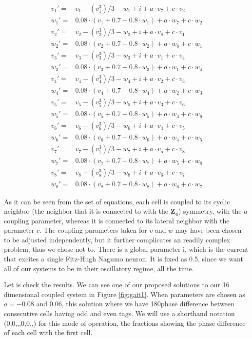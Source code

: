 \begin{align}
\nonumber v_1'=& v_1-(v_1^3)/3-w_1+i+a\cdot v_7+c \cdot v_2 \\
\nonumber w_1'=& 0.08\cdot (v_1+0.7-0.8\cdot w_1)+a \cdot w_7+c \cdot w_2\\
\nonumber v_2'=& v_2-(v_2^3)/3-w_2+i+a \cdot v_8+c \cdot v_1\\
\nonumber w_2'=& 0.08\cdot (v_2+0.7-0.8\cdot w_2)+a \cdot w_8+c \cdot w_1\\
\nonumber v_3'=& v_3-(v_3^3)/3-w_3+i+a \cdot v_1+c \cdot v_4\\
\nonumber w_3'=& 0.08\cdot (v_3+0.7-0.8\cdot w_3)+a \cdot w_1+c \cdot w_4\\
\nonumber v_4'=& v_4-(v_4^3)/3-w_4+i+a \cdot v_2+c \cdot v_3\\
w_4'=& 0.08\cdot (v_4+0.7-0.8\cdot w_4)+a \cdot w_2+c \cdot w_3\\
\nonumber v_5'=& v_5-(v_5^3)/3-w_5+i+a \cdot v_3+c \cdot v_6\\
\nonumber w_5'=& 0.08\cdot (v_5+0.7-0.8\cdot w_5)+a \cdot w_3+c \cdot w_6\\
\nonumber v_6'=& v_6-(v_6^3)/3-w_6+i+a \cdot v_4+c \cdot v_5\\
\nonumber w_6'=& 0.08\cdot (v_6+0.7-0.8\cdot w_6)+a \cdot w_4+c \cdot w_5\\
\nonumber v_7'=& v_7-(v_7^3)/3-w_7+i+a \cdot v_5+c \cdot v_8\\
\nonumber w_7'=& 0.08\cdot (v_7+0.7-0.8\cdot w_7)+a \cdot w_5+c \cdot w_8\\
\nonumber v_8'=& v_8-(v_8^3)/3-w_8+i+a \cdot v_6+c \cdot v_7\\
\nonumber w_8'=& 0.08\cdot (v_8+0.7-0.8\cdot w_8)+a \cdot w_6+c \cdot w_7
\end{align} 

As it can be seen from the set of equations, each cell is coupled to its cyclic neighbor (the neighbor that it is connected to with the $\mathbf{Z_4}$) symmetry, with the $a$ coupling parameter, whereas it is connected to its lateral neighbor with the parameter $c$. The coupling parameters taken for $v$ and $w$ may have been chosen to be adjusted independently, but it further complicates an readily complex problem, thus we chose not to. There is a global parameter i, which is the current that excites a single Fitz-Hugh Nagumo neuron. It is fixed as 0.5, since we want all of our systems to be in their oscillatory regime, all the time.

Let is check the results. We can see one of our proposed solutions to our 16 dimensional coupled system in Figure \ref{fig:gait1}. When parameters are chosen as $a = -0.08$ and $0.06$, this solution where we have 180\degree phase difference between consecutive cells having odd and even tags. We will use a shorthand notation (0,0,,,0,0,,) for this mode of operation, the fractions showing the phase difference of each cell with the first cell. 

